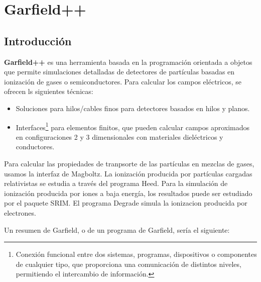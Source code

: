 \chapter{Garfield++}


\section{Introducción}

\textbf{Garfield++} es una herramienta basada en la programación orientada a objetos que permite simulaciones detalladas de detectores de partículas basadas en ionización de gases o semiconductores. Para calcular los campos eléctricos, se ofrecen ls siguientes técnicas: 

\begin{itemize}
    \item Soluciones para hilos/cables finos para detectores basados en hilos y planos. 
    \item Interfaces\footnote{Conexión funcional entre dos sistemas, programas, dispositivos o componentes de cualquier tipo, que proporciona una comunicación de distintos niveles, permitiendo el intercambio de información.} para elementos finitos, que pueden calcular campos aproximados en configuraciones 2 y 3 dimensionales con materiales dieléctricos y conductores. 
\end{itemize}
Para calcular las propiedades de tranpsorte de las partículas en mezclas de gases, usamos la interfaz de Magboltz. La ionización producida por partículas cargadas relativistas se estudia a través del programa Heed. Para la simulación de ionización producida por iones a baja energía, los resultados puede ser estudiado por el paquete SRIM. El programa Degrade simula la ionizacion producida por electrones. 

Un resumen de Garfield, o de un programa de Garfield, sería el siguiente:

